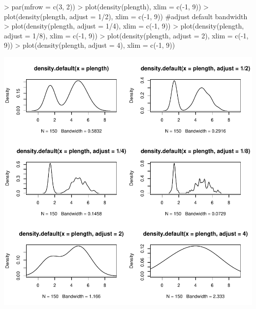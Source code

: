 \begin{Schunk}
\begin{Sinput}
> par(mfrow = c(3, 2))
> plot(density(plength), xlim = c(-1, 9))
> plot(density(plength, adjust = 1/2), xlim = c(-1, 9))  #adjust default bandwidth
> plot(density(plength, adjust = 1/4), xlim = c(-1, 9))
> plot(density(plength, adjust = 1/8), xlim = c(-1, 9))
> plot(density(plength, adjust = 2), xlim = c(-1, 9))
> plot(density(plength, adjust = 4), xlim = c(-1, 9))
\end{Sinput}
\end{Schunk}
\includegraphics{lect_chapter5_v2-028}


